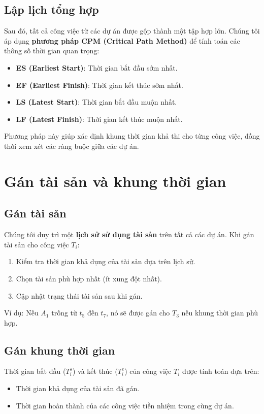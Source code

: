 \documentclass[a4paper,12pt]{article}
\begin{document}
\subsection{Lập lịch tổng hợp}
Sau đó, tất cả công việc từ các dự án được gộp thành một tập hợp lớn. Chúng tôi áp dụng \textbf{phương pháp CPM (Critical Path Method)} để tính toán các thông số thời gian quan trọng:
\begin{itemize}
    \item \textbf{ES (Earliest Start)}: Thời gian bắt đầu sớm nhất.
    \item \textbf{EF (Earliest Finish)}: Thời gian kết thúc sớm nhất.
    \item \textbf{LS (Latest Start)}: Thời gian bắt đầu muộn nhất.
    \item \textbf{LF (Latest Finish)}: Thời gian kết thúc muộn nhất.
\end{itemize}

Phương pháp này giúp xác định khung thời gian khả thi cho từng công việc, đồng thời xem xét các ràng buộc giữa các dự án.

\section{Gán tài sản và khung thời gian}

\subsection{Gán tài sản}
Chúng tôi duy trì một \textbf{lịch sử sử dụng tài sản} trên tất cả các dự án. Khi gán tài sản cho công việc $T_i$:
\begin{enumerate}
    \item Kiểm tra thời gian khả dụng của tài sản dựa trên lịch sử.
    \item Chọn tài sản phù hợp nhất (ít xung đột nhất).
    \item Cập nhật trạng thái tài sản sau khi gán.
\end{enumerate}

Ví dụ: Nếu $A_1$ trống từ $t_5$ đến $t_7$, nó sẽ được gán cho $T_3$ nếu khung thời gian phù hợp.

\subsection{Gán khung thời gian}
Thời gian bắt đầu ($T_i^s$) và kết thúc ($T_i^e$) của công việc $T_i$ được tính toán dựa trên:
\begin{itemize}
    \item Thời gian khả dụng của tài sản đã gán.
    \item Thời gian hoàn thành của các công việc tiền nhiệm trong cùng dự án.
\end{itemize}
\end{document}
